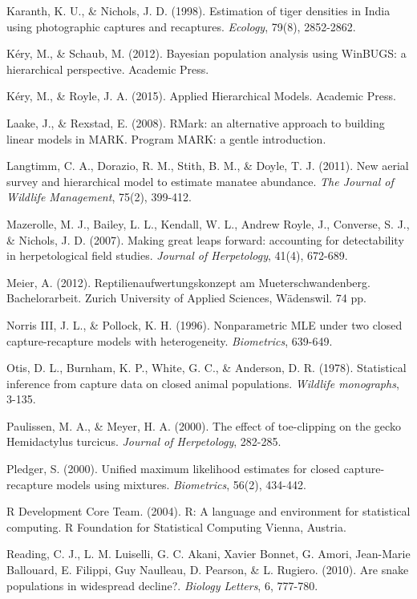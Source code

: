 \documentclass{book}
\begin{document}
\rf  Karanth, K. U., \& Nichols, J. D. (1998). Estimation of tiger densities in India using photographic captures and recaptures. \textit{Ecology}, 79(8), 2852-2862.

\rf K\'{e}ry, M., \& Schaub, M. (2012). Bayesian population analysis using WinBUGS: a hierarchical perspective. Academic Press.

\rf K\'{e}ry, M., \& Royle, J. A. (2015). Applied Hierarchical Models. Academic Press.

\rf Laake, J., \& Rexstad, E. (2008). RMark: an alternative approach to building linear models in MARK. Program MARK: a gentle introduction.

\rf Langtimm, C. A., Dorazio, R. M., Stith, B. M., \& Doyle, T. J. (2011). New aerial survey and hierarchical model to estimate manatee abundance. \textit{The Journal of Wildlife Management}, 75(2), 399-412.

\rf Mazerolle, M. J., Bailey, L. L., Kendall, W. L., Andrew Royle, J., Converse, S. J., \& Nichols, J. D. (2007). Making great leaps forward: accounting for detectability in herpetological field studies. \textit{Journal of Herpetology}, 41(4), 672-689.

\rf Meier, A. (2012). Reptilienaufwertungskonzept am Mueterschwandenberg. Bachelorarbeit. Zurich University of Applied Sciences, Wädenswil. 74 pp.

\rf Norris III, J. L., \& Pollock, K. H. (1996). Nonparametric MLE under two closed capture-recapture models with heterogeneity. \textit{Biometrics}, 639-649.

\rf Otis, D. L., Burnham, K. P., White, G. C., \& Anderson, D. R. (1978). Statistical inference from capture data on closed animal populations. \textit{Wildlife monographs}, 3-135.

\rf Paulissen, M. A., \& Meyer, H. A. (2000). The effect of toe-clipping on the gecko Hemidactylus turcicus. \textit{Journal of Herpetology}, 282-285.

\rf Pledger, S. (2000). Unified maximum likelihood estimates for closed capture-recapture models using mixtures. \textit{Biometrics}, 56(2), 434-442.

\rf R Development Core Team. (2004). R: A language and environment for statistical computing. R Foundation for Statistical Computing Vienna, Austria.

\rf Reading, C. J., L. M. Luiselli, G. C. Akani, Xavier Bonnet, G. Amori, Jean-Marie Ballouard, E. Filippi, Guy Naulleau, D. Pearson, \& L. Rugiero. (2010). Are snake populations in widespread decline?. \textit{Biology Letters}, 6, 777-780.
\end{document}

